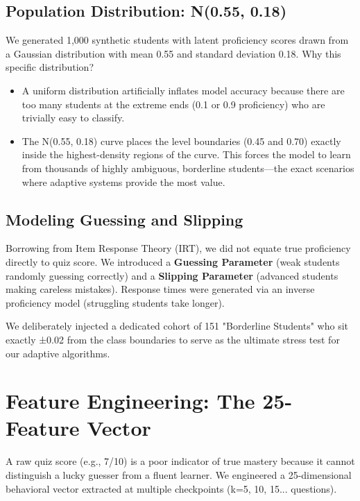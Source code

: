 \documentclass[11pt,a4paper]{article}
\begin{document}
\subsection{Population Distribution: N(0.55, 0.18)}
We generated 1,000 synthetic students with latent proficiency scores drawn from a Gaussian distribution with mean 0.55 and standard deviation 0.18. Why this specific distribution?
\begin{itemize}[label=\textcolor{primaryblue}{\textbullet}]
    \item A uniform distribution artificially inflates model accuracy because there are too many students at the extreme ends (0.1 or 0.9 proficiency) who are trivially easy to classify.
    \item The N(0.55, 0.18) curve places the level boundaries (0.45 and 0.70) exactly inside the highest-density regions of the curve. This forces the model to learn from thousands of highly ambiguous, borderline students—the exact scenarios where adaptive systems provide the most value.
\end{itemize}

\subsection{Modeling Guessing and Slipping}
Borrowing from Item Response Theory (IRT), we did not equate true proficiency directly to quiz score. We introduced a \textbf{Guessing Parameter} (weak students randomly guessing correctly) and a \textbf{Slipping Parameter} (advanced students making careless mistakes). Response times were generated via an inverse proficiency model (struggling students take longer).

We deliberately injected a dedicated cohort of 151 "Borderline Students" who sit exactly ±0.02 from the class boundaries to serve as the ultimate stress test for our adaptive algorithms.

\section{Feature Engineering: The 25-Feature Vector}
A raw quiz score (e.g., 7/10) is a poor indicator of true mastery because it cannot distinguish a lucky guesser from a fluent learner. We engineered a 25-dimensional behavioral vector extracted at multiple checkpoints (k=5, 10, 15... questions).
\end{document}
